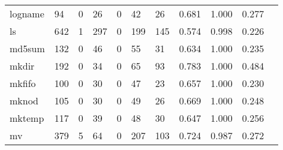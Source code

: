 \begin{longtable}{lp{1.10cm}p{1.10cm}p{1.10cm}p{1.10cm}p{1.10cm}p{1.10cm}p{1.10cm}p{1.10cm}p{1.10cm}p{1.10cm}}
logname   &                     94 &                                  0 &                                26 &                                0 &                                42 &                              26 &                          0.681 &                                 1.000 &                               0.277 \\
ls        &                    642 &                                  1 &                               297 &                                0 &                               199 &                             145 &                          0.574 &                                 0.998 &                               0.226 \\
md5sum    &                    132 &                                  0 &                                46 &                                0 &                                55 &                              31 &                          0.634 &                                 1.000 &                               0.235 \\
mkdir     &                    192 &                                  0 &                                34 &                                0 &                                65 &                              93 &                          0.783 &                                 1.000 &                               0.484 \\
mkfifo    &                    100 &                                  0 &                                30 &                                0 &                                47 &                              23 &                          0.657 &                                 1.000 &                               0.230 \\
mknod     &                    105 &                                  0 &                                30 &                                0 &                                49 &                              26 &                          0.669 &                                 1.000 &                               0.248 \\
mktemp    &                    117 &                                  0 &                                39 &                                0 &                                48 &                              30 &                          0.647 &                                 1.000 &                               0.256 \\
mv        &                    379 &                                  5 &                                64 &                                0 &                               207 &                             103 &                          0.724 &                                 0.987 &                               0.272 \\

\end{longtable}
